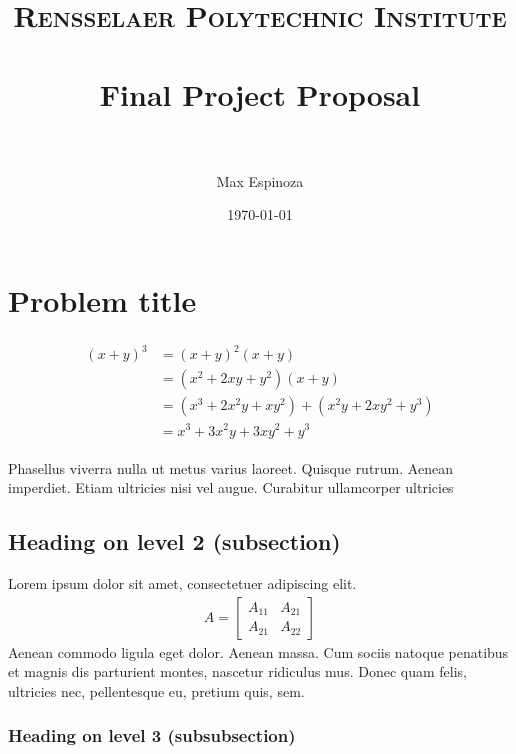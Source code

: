 \documentclass[paper=a4, fontsize=11pt]{scrartcl} %
\title{	
\normalfont \normalsize 
\textsc{Rensselaer Polytechnic Institute} \\ [25pt] %
\horrule{0.5pt} \\[0.4cm] %
\huge Final Project Proposal \\ %
\horrule{2pt} \\[0.5cm] %
}
\author{Max Espinoza} %
\date{\normalsize\today} %
\numberwithin{equation}{section} %
\numberwithin{figure}{section} %
\numberwithin{table}{section} %
\begin{document}
\maketitle %


\section{Problem title}

\lipsum[2] %

\begin{align} 
\begin{split}
(x+y)^3 	&= (x+y)^2(x+y)\\
&=(x^2+2xy+y^2)(x+y)\\
&=(x^3+2x^2y+xy^2) + (x^2y+2xy^2+y^3)\\
&=x^3+3x^2y+3xy^2+y^3
\end{split}					
\end{align}

Phasellus viverra nulla ut metus varius laoreet. Quisque rutrum. Aenean imperdiet. Etiam ultricies nisi vel augue. Curabitur ullamcorper ultricies


\subsection{Heading on level 2 (subsection)}

Lorem ipsum dolor sit amet, consectetuer adipiscing elit. 
\begin{align}
A = 
\begin{bmatrix}
A_{11} & A_{21} \\
A_{21} & A_{22}
\end{bmatrix}
\end{align}
Aenean commodo ligula eget dolor. Aenean massa. Cum sociis natoque penatibus et magnis dis parturient montes, nascetur ridiculus mus. Donec quam felis, ultricies nec, pellentesque eu, pretium quis, sem.


\subsubsection{Heading on level 3 (subsubsection)}
\end{document}
